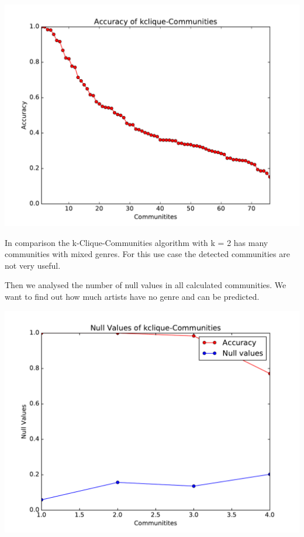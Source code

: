 \documentclass[11pt,a4paper,onecolumn,notitlepage]{article}
\begin{document}
\includegraphics[scale=0.4]{spotify_acc_kclique.pdf}

In comparison the k-Clique-Communities algorithm with k = 2 has many communities with mixed genres. For this use case the detected communities are not very useful.

Then we analysed the number of null values in all calculated communities. We want to find out how much artists have no genre and can be predicted.

\includegraphics[scale=0.4]{spotify_null_kclique.pdf}
\end{document}

